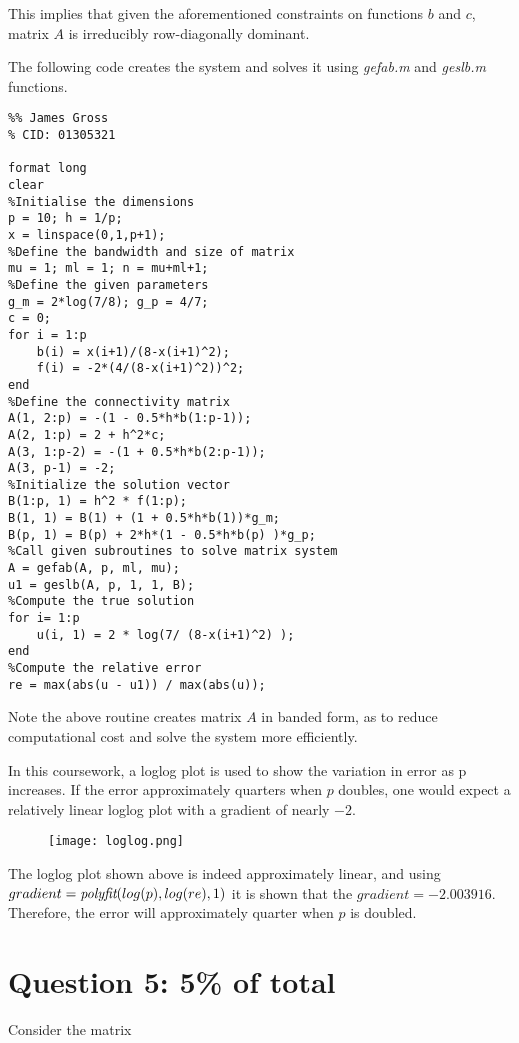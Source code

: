 \documentclass[12pt]{article}
\begin{document}
This implies that given the aforementioned constraints on functions $b$ and $c$, matrix $A$ is irreducibly row-diagonally dominant.

The following code creates the system and solves it using \emph{gefab.m} and \emph{geslb.m} functions.

\begin{lstlisting}
%% James Gross
% CID: 01305321

format long
clear
%Initialise the dimensions
p = 10; h = 1/p;
x = linspace(0,1,p+1);
%Define the bandwidth and size of matrix
mu = 1; ml = 1; n = mu+ml+1;
%Define the given parameters
g_m = 2*log(7/8); g_p = 4/7;
c = 0;
for i = 1:p
    b(i) = x(i+1)/(8-x(i+1)^2);
    f(i) = -2*(4/(8-x(i+1)^2))^2;
end
%Define the connectivity matrix
A(1, 2:p) = -(1 - 0.5*h*b(1:p-1));
A(2, 1:p) = 2 + h^2*c;
A(3, 1:p-2) = -(1 + 0.5*h*b(2:p-1));
A(3, p-1) = -2;
%Initialize the solution vector
B(1:p, 1) = h^2 * f(1:p);
B(1, 1) = B(1) + (1 + 0.5*h*b(1))*g_m;
B(p, 1) = B(p) + 2*h*(1 - 0.5*h*b(p) )*g_p;
%Call given subroutines to solve matrix system
A = gefab(A, p, ml, mu);
u1 = geslb(A, p, 1, 1, B);
%Compute the true solution
for i= 1:p
    u(i, 1) = 2 * log(7/ (8-x(i+1)^2) );
end
%Compute the relative error
re = max(abs(u - u1)) / max(abs(u));
\end{lstlisting}
Note the above routine creates matrix $A$ in banded form, as to reduce computational cost and solve the system more efficiently.

In this coursework, a loglog plot is used to show the variation in error as p increases. If the error approximately quarters when $p$ doubles, one would expect a relatively linear loglog plot with a gradient of nearly $-2$.

\begin{figure}[ht]
	\centering
    \texttt{[image: loglog.png]}
\end{figure}

The loglog plot shown above is indeed approximately linear, and using $gradient = \\ \mathrm{\emph{polyfit}}(log(p), log(re), 1)$ it is shown that the $gradient = -2.003916$. Therefore, the error will approximately quarter when $p$ is doubled.

\newpage


\section*{Question 5: 5\% of total}
Consider the matrix
\end{document}
